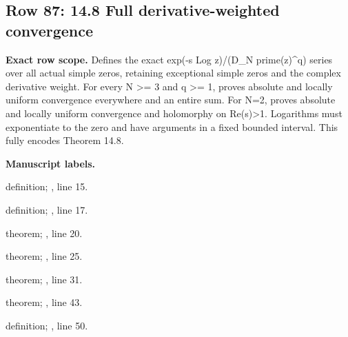 \subsection{Row 87: 14.8 Full derivative-weighted convergence}
\label{row:87}
\textbf{Exact row scope.} Defines the exact exp(-s Log z)/(D\_N prime(z)\textasciicircum{}q) series over all actual simple zeros, retaining exceptional simple zeros and the complex derivative weight. For every N >= 3 and q >= 1, proves absolute and locally uniform convergence everywhere and an entire sum. For N=2, proves absolute and locally uniform convergence and holomorphy on Re(s)>1. Logarithms must exponentiate to the zero and have arguments in a fixed bounded interval. This fully encodes Theorem 14.8.\par\smallskip
\textbf{Manuscript labels.} \par\smallskip
{\small{}\par}
{\footnotesize\color{muted}definition; , line 15.\par}\smallskip
{\small{}\par}
{\footnotesize\color{muted}definition; , line 17.\par}\smallskip
{\small{}\par}
{\footnotesize\color{muted}theorem; , line 20.\par}\smallskip
{\small{}\par}
{\footnotesize\color{muted}theorem; , line 25.\par}\smallskip
{\small{}\par}
{\footnotesize\color{muted}theorem; , line 31.\par}\smallskip
{\small{}\par}
{\footnotesize\color{muted}theorem; , line 43.\par}\smallskip
{\small{}\par}
{\footnotesize\color{muted}definition; , line 50.\par}\smallskip
